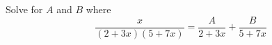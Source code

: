 Solve for $A$ and $B$  where
\[
\frac{x}{(2 + 3x)(5 + 7x)} = \frac{A}{2 + 3x} + \frac{B}{5 + 7x}
\]
